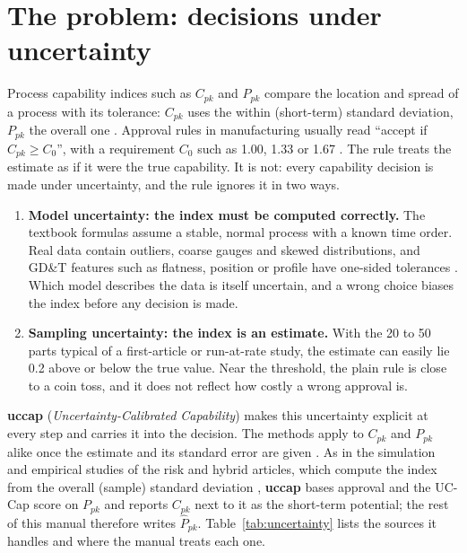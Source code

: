 \documentclass[a4paper,11pt,oneside,openany,parskip=half-,headings=standardclasses,toc=flat,numbers=noenddot]{scrbook}
\newcommand{\pkg}{\textsf{\bfseries uccap}}
\newcommand{\tabref}[1]{Table~\ref{#1}}
\newcommand{\Cpkhat}{\widehat{C}_{pk}}
\newcommand{\Ppkhat}{\widehat{P}_{pk}}
\begin{document}
\section{The problem: decisions under uncertainty}

Process capability indices such as $C_{pk}$ and $P_{pk}$ compare the location and spread of a process with
its tolerance: $C_{pk}$ uses the within (short-term) standard deviation, $P_{pk}$ the overall one
\cite[Secs.~3.2, 3.5]{jy-workflow}. Approval rules in manufacturing usually read ``accept if $\Cpkhat \ge C_0$'',
with a requirement $C_0$ such as 1.00, 1.33 or 1.67 \cite[Sec.~1]{jy-risk}. The rule treats the estimate as if
it were the true capability. It is not: every capability decision is made under uncertainty, and the rule
ignores it in two ways.

\begin{enumerate}
\item \textbf{Model uncertainty: the index must be computed correctly.} The textbook formulas assume a
  stable, normal process with a known time order. Real data contain outliers, coarse gauges and skewed
  distributions, and GD\&T features such as flatness, position or profile have one-sided tolerances
  \cite[Sec.~3.1.3]{jy-workflow}. Which model describes the data
  is itself uncertain, and a wrong choice biases the index before any decision is made.
\item \textbf{Sampling uncertainty: the index is an estimate.} With the 20 to 50 parts typical of a
  first-article or run-at-rate study, the estimate can easily lie 0.2 above or below the true value.
  Near the threshold, the plain rule is close to a coin toss, and it does not reflect how costly a
  wrong approval is.
\end{enumerate}

\pkg{} (\emph{Uncertainty-Calibrated Capability}) makes this uncertainty explicit at every step and
carries it into the decision. The methods apply to $C_{pk}$ and $P_{pk}$ alike once the estimate and its
standard error are given \cite[Sec.~2]{jy-hybrid}. As in the simulation and empirical studies of the risk and
hybrid articles, which compute the index from the overall (sample) standard deviation
\cite[Sec.~5.1.3]{jy-risk}\cite[Sec.~2]{jy-hybrid}, \pkg{} bases approval and the UC-Cap score on $P_{pk}$ and
reports $C_{pk}$ next to it as the short-term potential; the rest of this manual therefore writes $\Ppkhat$. \tabref{tab:uncertainty} lists the sources it handles and where the
manual treats each one.
\end{document}
